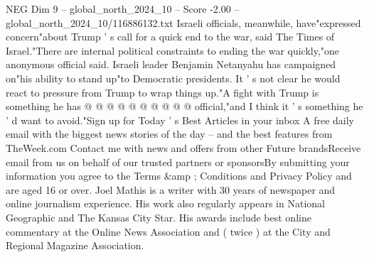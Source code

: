 \begin{textsample}{NEG Dim 9 – global\_north\_2024\_10 – Score -2.00 – global\_north\_2024\_10/116886132.txt}
Israeli officials, meanwhile, have"expressed concern"about Trump ' s call for a quick end to the war, said The Times of Israel."There are internal political constraints to ending the war quickly,"one anonymous official said.
Israeli leader Benjamin Netanyahu has campaigned on"his ability to stand up"to Democratic presidents.
It ' s not clear he would react to pressure from Trump to wrap things up."A fight with Trump is something he has @ @ @ @ @ @ @ @ @ @ official,"and I think it ' s something he ' d want to avoid."Sign up for Today ' s Best Articles in your inbox A free daily email with the biggest news stories of the day -- and the best features from TheWeek.com Contact me with news and offers from other Future brandsReceive email from us on behalf of our trusted partners or sponsorsBy submitting your information you agree to the Terms \&amp ; Conditions and Privacy Policy and are aged 16 or over.
Joel Mathis is a writer with 30 years of newspaper and online journalism experience.
His work also regularly appears in National Geographic and The Kansas City Star.
His awards include best online commentary at the Online News Association and ( twice ) at the City and Regional Magazine Association.

\end{textsample}
